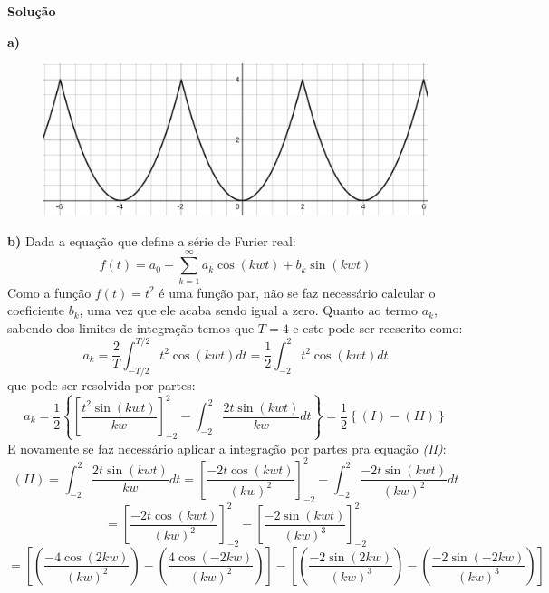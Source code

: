 \linespread{1.5}
\textbf{Solução}

\textbf{a)}
\begin{figure}[H]
    \centering
    \includegraphics[width=0.6\linewidth]{fig/sf3a}
    \label{fig:sf3}
\end{figure}

\textbf{b)}
Dada a equação que define a série de Furier real:
\begin{equation}
    \label{eq:Fourierserie}
    f(t) = a_0 + \sum_{k=1}^\infty a_k\cos{(kwt)} + b_k\sin{(kwt)}
\end{equation}
Como a função $f(t) = t^2$ é uma função par, não se faz necessário calcular o coeficiente $b_k$, uma vez que ele acaba sendo igual a zero.
Quanto ao termo $a_k$, sabendo dos limites de integração temos que $T=4$ e este pode ser reescrito como:
\begin{equation*}
    a_k = \frac{2}{T}\int_{-T/2}^{T/2}t^2\cos{(kwt)}dt = \frac{1}{2}\int_{-2}^2t^2 \cos{(kwt)}dt
\end{equation*}
que pode ser resolvida por partes:
\begin{equation}
    \label{eq:sf3b}
    a_k = \frac{1}{2}\left\{\left[\frac{t^2\sin{(kwt)}}{kw}\right]^2_{-2} - \int_{-2}^2 \frac{2t\sin{(kwt)}}{kw}dt\right\} = \frac{1}{2}\left\{(I) - (II)\right\} 
\end{equation}
E novamente se faz necessário aplicar a integração por partes pra equação \textit{(II)}:
\begin{equation*}
    (II) = \int_{-2}^2 \frac{2t\sin{(kwt)}}{kw}dt = \left[\frac{-2t\cos{(kwt)}}{(kw)^2}\right]^2_{-2} - \int_{-2}^2 \frac{-2t\sin{(kwt)}}{(kw)^2}dt
\end{equation*}
\begin{equation*}
    = \left[\frac{-2t\cos{(kwt)}}{(kw)^2}\right]^2_{-2} - \left[\frac{-2\sin{(kwt)}}{(kw)^3}\right]^2_{-2} 
\end{equation*}
\begin{equation*}
    = \left[\left(\frac{-4\cos{(2kw)}}{(kw)^2}\right) - \left(\frac{4\cos{(-2kw)}}{(kw)^2}\right)\right] - \left[\left(\frac{-2\sin{(2kw)}}{(kw)^3}\right) - \left(\frac{-2\sin{(-2kw)}}{(kw)^3}\right)\right]
\end{equation*}
